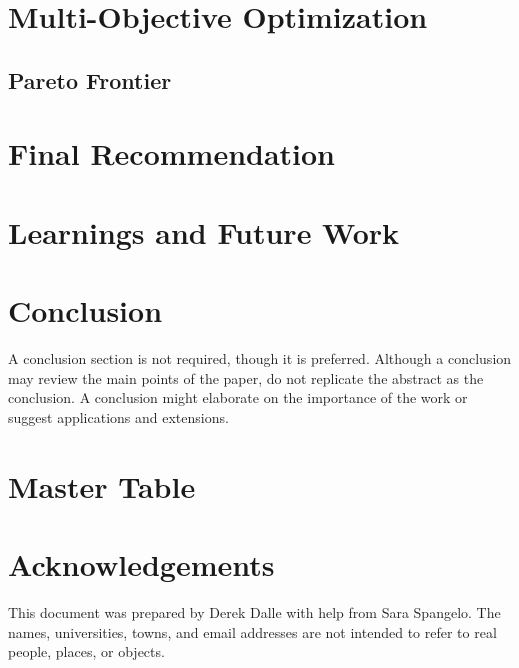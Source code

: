 \documentclass[]{aiaa-pretty}
\begin{document}

\section{Multi-Objective Optimization}
\label{sec:multi}

\subsection{Pareto Frontier}


\section{Final Recommendation}


\section{Learnings and Future Work} 

\section{Conclusion}
A conclusion section is not required, though it is preferred. Although a conclusion may review the main points of the paper, do not replicate the abstract as the conclusion. A conclusion might elaborate on the importance of the work or suggest applications and extensions. 

\appendix
\section{Master Table}
\label{app:mastertab}


\section*{Acknowledgements}
This document was prepared by Derek Dalle with help from Sara Spangelo.  The names, universities, towns, and email addresses are not intended to refer to real people, places, or objects.



\end{document}

